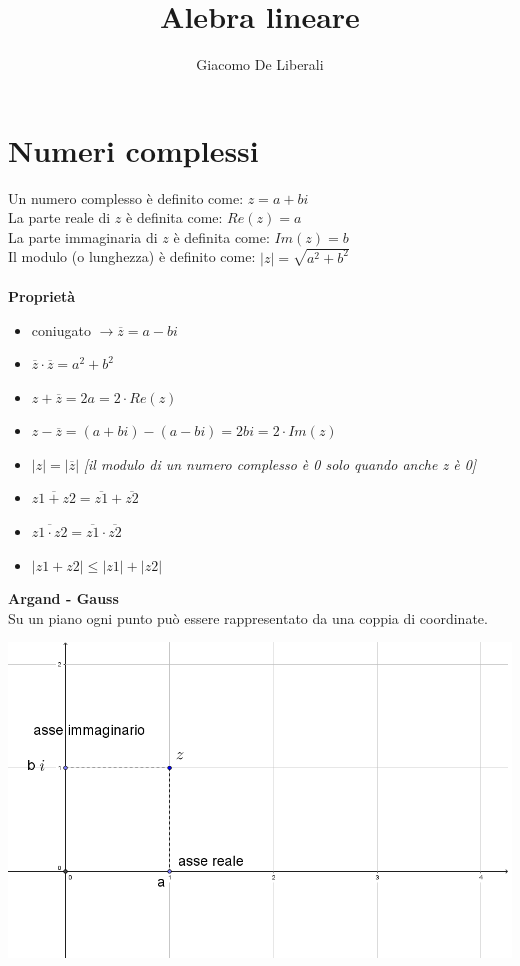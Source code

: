 \documentclass[italian]{article}
\author{Giacomo De Liberali}
\begin{document}
	
\title{Alebra lineare}
\maketitle

\tableofcontents
\pagebreak

\section{Numeri complessi}
Un numero complesso è definito come: $z=a+bi$\\
La parte reale di $z$ è definita come: $Re(z)=a$\\
La parte immaginaria di $z$ è definita come: $Im(z)=b$ \\
Il modulo (o lunghezza) è definito come: $|z| = \sqrt{a^2+b^2}$\\\\
\textbf{Proprietà}\\
\begin{itemize}
	\item coniugato $\to \overline{z} = a - bi$	
	\item $\overline{z} \cdot \overline{z} = a^2+b^2$
	\item $z + \overline{z} = 2a = 2\cdot Re(z)$
	\item $z-\overline{z}=(a+bi)-(a-bi)=2bi = 2\cdot Im(z)$
	\item $|z|=|\overline{z}|$ \qquad \emph{[il modulo di un numero complesso è 0 solo quando anche z è 0]}
	\item $\overline{z1+z2}=\overline{z1}+\overline{z2}$
	\item $\overline{z1\cdot z2}=\overline{z1}\cdot \overline{z2}$
	\item $|z1+z2|\leq |z1|+|z2|$
\end{itemize}
\textbf{Argand - Gauss}\\
Su un piano ogni punto può essere rappresentato da una coppia di coordinate.\\
\begin{center}
	\includegraphics[width=0.5\linewidth]{img/argan_gauss}	
\end{center}
\pagebreak
\end{document}
